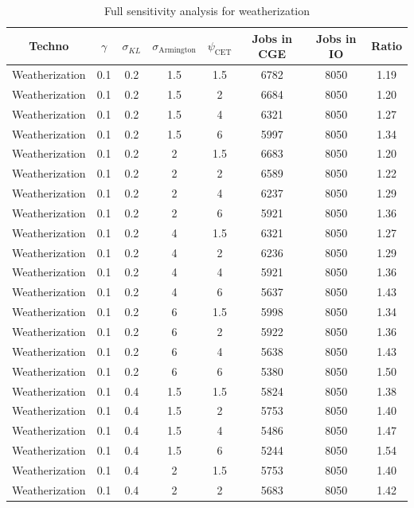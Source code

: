 \begin{table}
	\small
		\centering
		\caption{Full sensitivity analysis for weatherization}
		\begin{tabular}{cccccccc}
		\toprule
			Techno & $\gamma$ & $\sigma_{KL}$ & $\sigma_{\text{Armington}}$ & $\psi_{\text{CET}}$ & Jobs in CGE &Jobs in IO & Ratio \\
		\midrule
		Weatherization & 0.1 & 0.2 & 1.5 & 1.5 & 6782 & 8050 & 1.19 \\
		Weatherization & 0.1 & 0.2 & 1.5 & 2 & 6684 & 8050 & 1.20 \\
		Weatherization & 0.1 & 0.2 & 1.5 & 4 & 6321 & 8050 & 1.27 \\
		Weatherization & 0.1 & 0.2 & 1.5 & 6 & 5997 & 8050 & 1.34 \\
		Weatherization & 0.1 & 0.2 & 2 & 1.5 & 6683 & 8050 & 1.20 \\
		Weatherization & 0.1 & 0.2 & 2 & 2 & 6589 & 8050 & 1.22 \\
		Weatherization & 0.1 & 0.2 & 2 & 4 & 6237 & 8050 & 1.29 \\
		Weatherization & 0.1 & 0.2 & 2 & 6 & 5921 & 8050 & 1.36 \\
		Weatherization & 0.1 & 0.2 & 4 & 1.5 & 6321 & 8050 & 1.27 \\
		Weatherization & 0.1 & 0.2 & 4 & 2 & 6236 & 8050 & 1.29 \\
		Weatherization & 0.1 & 0.2 & 4 & 4 & 5921 & 8050 & 1.36 \\
		Weatherization & 0.1 & 0.2 & 4 & 6 & 5637 & 8050 & 1.43 \\
		Weatherization & 0.1 & 0.2 & 6 & 1.5 & 5998 & 8050 & 1.34 \\
		Weatherization & 0.1 & 0.2 & 6 & 2 & 5922 & 8050 & 1.36 \\
		Weatherization & 0.1 & 0.2 & 6 & 4 & 5638 & 8050 & 1.43 \\
		Weatherization & 0.1 & 0.2 & 6 & 6 & 5380 & 8050 & 1.50 \\
		Weatherization & 0.1 & 0.4 & 1.5 & 1.5 & 5824 & 8050 & 1.38 \\
		Weatherization & 0.1 & 0.4 & 1.5 & 2 & 5753 & 8050 & 1.40 \\
		Weatherization & 0.1 & 0.4 & 1.5 & 4 & 5486 & 8050 & 1.47 \\
		Weatherization & 0.1 & 0.4 & 1.5 & 6 & 5244 & 8050 & 1.54 \\
		Weatherization & 0.1 & 0.4 & 2 & 1.5 & 5753 & 8050 & 1.40 \\
		Weatherization & 0.1 & 0.4 & 2 & 2 & 5683 & 8050 & 1.42 \\

\end{tabular}
\end{table}
